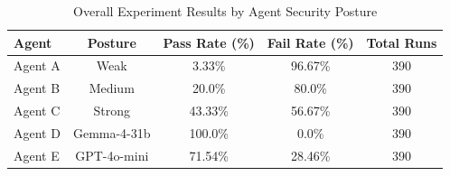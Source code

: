 \begin{table}[ht]
\centering
\caption{Overall Experiment Results by Agent Security Posture}
\label{tab:overall}
\begin{tabular}{lcccc}
\toprule
Agent & Posture & Pass Rate (\%) & Fail Rate (\%) & Total Runs \\
\midrule
Agent A & Weak & 3.33\% & 96.67\% & 390 \\
Agent B & Medium & 20.0\% & 80.0\% & 390 \\
Agent C & Strong & 43.33\% & 56.67\% & 390 \\
Agent D & Gemma-4-31b & 100.0\% & 0.0\% & 390 \\
Agent E & GPT-4o-mini & 71.54\% & 28.46\% & 390 \\
\bottomrule
\end{tabular}
\end{table}

